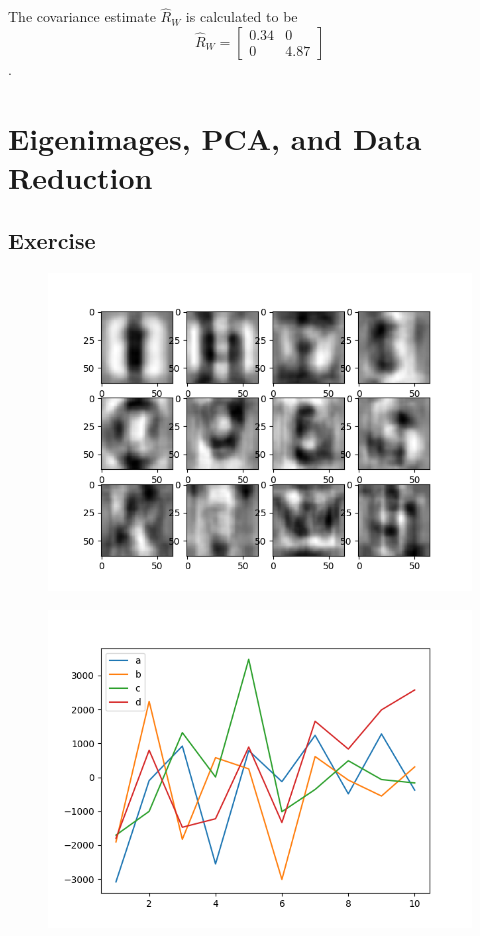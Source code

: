\documentclass{article}
\begin{document}
The covariance estimate $\hat{R}_W$ is calculated to be
\begin{equation*}
\hat{R}_W = 
\begin{bmatrix}
    0.34 & 0 \\
    0 & 4.87
\end{bmatrix}
\end{equation*}.

\section{Eigenimages, PCA, and Data Reduction}
\subsection{Exercise}
\begin{figure}[H]
    \centering
    \includegraphics[width=1\textwidth]{../eigenimages.png}
\end{figure}
\begin{figure}[H]
    \centering
    \includegraphics[width=1\textwidth]{../projection-coefficients.png}
\end{figure}
\end{document}
